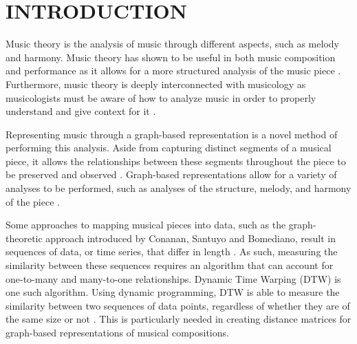\chapter{INTRODUCTION}

Music theory is the analysis of music through different aspects, such as melody and harmony. Music theory has shown to be useful in both music composition and performance as it allows for a more structured analysis of the music piece \cite{OrioRoda}. Furthermore, music theory is deeply interconnected with musicology as musicologists must be aware of how to analyze music in order to properly understand and give context for it \cite{Burkholder}.

Representing music through a graph-based representation is a novel method of performing this analysis. Aside from capturing distinct segments of a musical piece, it allows the relationships between these segments throughout the piece to be preserved and observed \cite{HernandezOlivanBeltran}. Graph-based representations allow for a variety of analyses to be performed, such as analyses of the structure, melody, and harmony of the piece \cite{ClarkCook, ConananEtAl}.

Some approaches to mapping musical pieces into data, such as the graph-theoretic approach introduced by Conanan, Santuyo and Bomediano, result in sequences of data, or time series, that differ in length \cite{ConananEtAl}. As such, measuring the similarity between these sequences requires an algorithm that can account for one-to-many and many-to-one relationships. Dynamic Time Warping (DTW) is one such algorithm. Using dynamic programming, DTW is able to measure the similarity between two sequences of data points, regardless of whether they are of the same size or not \cite{ConananEtAl}. This is particularly needed in creating distance matrices for graph-based representations of musical compositions.







